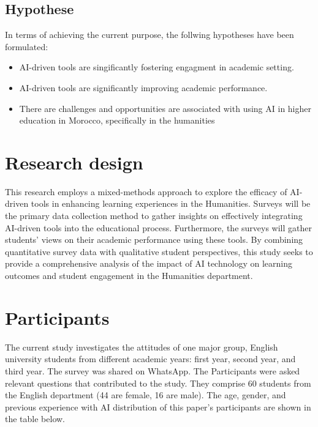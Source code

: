 \subsection{Hypothese}
In terms of achieving the current purpose, the follwing hypotheses have been formulated:
\begin{itemize}
	\item AI-driven tools are singificantly fostering engagment in academic setting.
	\item AI-driven tools are significantly improving academic performance.
	\item There are challenges and opportunities are associated with using AI in higher education
	      in Morocco, specifically in the humanities
\end{itemize}

\section{Research design}
This research employs a mixed-methods approach to explore the
efficacy of AI-driven tools in enhancing learning experiences
in the Humanities. Surveys will be the primary data collection
method to gather insights on effectively integrating AI-driven
tools into the educational process. Furthermore, the surveys will
gather students’ views on their academic performance using these
tools. By combining quantitative survey data with qualitative
student perspectives, this study seeks to provide a comprehensive
analysis of the impact of AI technology on learning outcomes and
student engagement in the Humanities department.
\section{Participants}
The current study investigates the attitudes of one major group,
English university students from different academic years: first year,
second year, and third year. The survey was shared on WhatsApp.
The Participants were asked relevant questions that contributed
to the study. They comprise 60 students from the English department
(44 are female, 16 are male). The age, gender, and previous experience
with AI distribution of this paper’s participants are shown in the table below.

